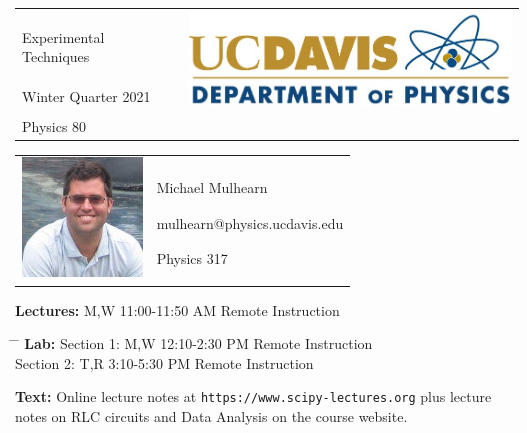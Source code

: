 \documentclass[12pt]{article}
\begin{document}
\noindent
\begin{tabular*}{\textwidth}{l @{\extracolsep{\fill}} r}
  & \multirow{3}{*}{\includegraphics[height=1.0in]{logo.jpg}} \\
  \large Experimental Techniques & \\
  \large Winter Quarter 2021 & \\
  \large Physics 80 & \\
\end{tabular*}
\vspace{10mm}

\noindent
\begin{tabular}{ l l }
  \multirow{6}{*}{\includegraphics[height=1.25in]{mike.jpg}} & \\
  & \\
  & \large Michael Mulhearn \\
  & \large mulhearn@physics.ucdavis.edu \\
  & \large Physics 317 \\
  & \\
\end{tabular}
\vskip 0.5cm
\noindent
\textbf {Lectures:} M,W 11:00-11:50 AM  Remote Instruction
\begin{tabbing}
\hspace*{3em}\= \hspace*{5em} \= \kill %
\textbf {Lab:}    \> Section 1: \> M,W 12:10-2:30 PM Remote Instruction\\
                  \> Section 2: \> T,R 3:10-5:30 PM Remote Instruction\\
\end{tabbing}

\noindent
\textbf {Text:}  Online lecture notes at {\tt https://www.scipy-lectures.org} plus
lecture notes on RLC circuits and Data Analysis on the course website. \\
\end{document}
